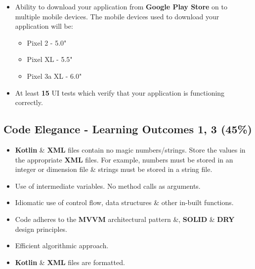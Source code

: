 \documentclass{article}
\begin{document}
\begin{itemize}
\begin{itemize}
	      \end{itemize}
	\item Ability to download your application from \textbf{Google Play Store} on to multiple mobile devices. The mobile devices used to download your application will be:
	      \begin{itemize}
		      \item Pixel 2 - 5.0"
		      \item Pixel XL - 5.5"
		      \item Pixel 3a XL - 6.0"
	      \end{itemize}
	\item At least \textbf{15} UI tests which verify that your application is functioning correctly.
\end{itemize}

\subsection*{Code Elegance - Learning Outcomes 1, 3 (45\%)}
\begin{itemize}
	\item \textbf{Kotlin} \& \textbf{XML} files contain no magic numbers/strings. Store the values in the appropriate \textbf{XML} files. For example, numbers must be stored in an integer or dimension file \& strings must be stored in a string file.
	\item Use of intermediate variables. No method calls as arguments.
	\item Idiomatic use of control flow, data structures \& other in-built functions.
	\item Code adheres to the \textbf{MVVM} architectural pattern \&, \textbf{SOLID} \& \textbf{DRY} design principles.
	\item Efficient algorithmic approach.
	\item \textbf{Kotlin} \& \textbf{XML} files are formatted.
\end{itemize}
\end{document}
